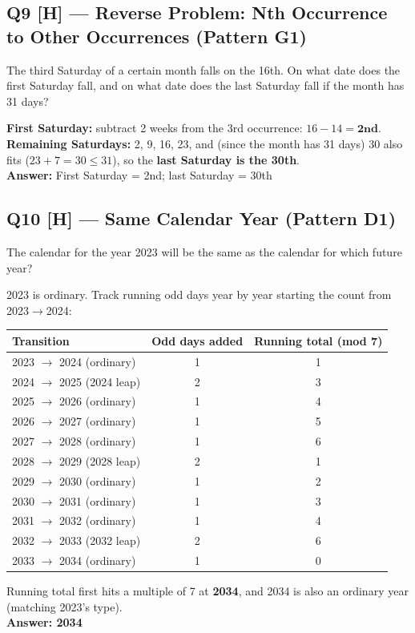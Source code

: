 \documentclass[11pt]{article}
\begin{document}
\subsection*{Q9 [H] --- Reverse Problem: Nth Occurrence to Other Occurrences (Pattern G1)}
The third Saturday of a certain month falls on the 16th. On what date does the first Saturday fall,
and on what date does the last Saturday fall if the month has 31 days?

\begin{tipbox}[Solution]
\textbf{First Saturday:} subtract 2 weeks from the 3rd occurrence: $16-14=\textbf{2nd}$.\\
\textbf{Remaining Saturdays:} 2, 9, 16, 23, and (since the month has 31 days) 30 also fits
($23+7=30\le31$), so the \textbf{last Saturday is the 30th}.\\
\textbf{Answer:} First Saturday = 2nd; last Saturday = 30th
\end{tipbox}

\subsection*{Q10 [H] --- Same Calendar Year (Pattern D1)}
The calendar for the year 2023 will be the same as the calendar for which future year?

\begin{tipbox}[Solution]
2023 is ordinary. Track running odd days year by year starting the count from 2023$\to$2024:
\begin{center}
\begin{tabular}{lcc}
\toprule
\textbf{Transition} & \textbf{Odd days added} & \textbf{Running total (mod 7)} \\
\midrule
2023 $\to$ 2024 (ordinary) & 1 & 1 \\
2024 $\to$ 2025 (2024 leap) & 2 & 3 \\
2025 $\to$ 2026 (ordinary) & 1 & 4 \\
2026 $\to$ 2027 (ordinary) & 1 & 5 \\
2027 $\to$ 2028 (ordinary) & 1 & 6 \\
2028 $\to$ 2029 (2028 leap) & 2 & 1 \\
2029 $\to$ 2030 (ordinary) & 1 & 2 \\
2030 $\to$ 2031 (ordinary) & 1 & 3 \\
2031 $\to$ 2032 (ordinary) & 1 & 4 \\
2032 $\to$ 2033 (2032 leap) & 2 & 6 \\
2033 $\to$ 2034 (ordinary) & 1 & 0 \\
\bottomrule
\end{tabular}
\end{center}
Running total first hits a multiple of 7 at \textbf{2034}, and 2034 is also an ordinary year
(matching 2023's type).\\
\textbf{Answer: 2034}
\end{tipbox}
\end{document}

